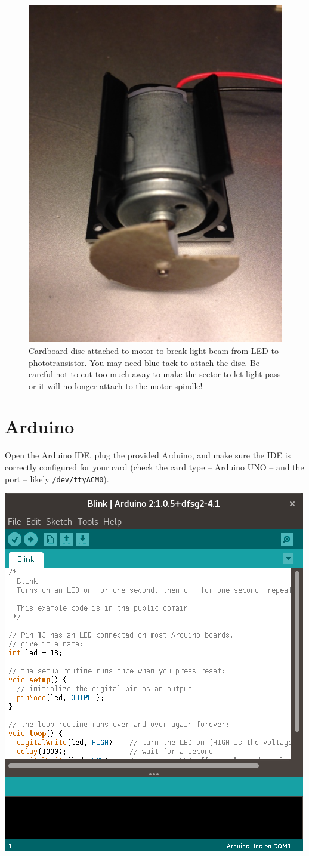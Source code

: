 \documentclass{instructions}
\begin{document}
\begin{figure}[h!]
    \centering
    \includegraphics[width=0.5\linewidth]{encoder-007}
    \caption{Cardboard disc attached to motor to break light beam from LED to
    phototransistor. You may need blue tack to attach the disc. Be careful not
    to cut  too  much  away  to  make  the  sector  to  let  light  pass  or  it
    will  no  longer attach to the motor spindle!}

    \label{motor-encoder}
\end{figure}


\part{Arduino}


Open the Arduino IDE, plug the provided Arduino, and make sure the IDE is
correctly configured for your card (check the card type -- Arduino UNO -- and
the port -- likely \texttt{/dev/ttyACM0}).

\begin{center}
    \includegraphics[width=0.5\linewidth]{arduino-ide}
\end{center}
\end{document}
